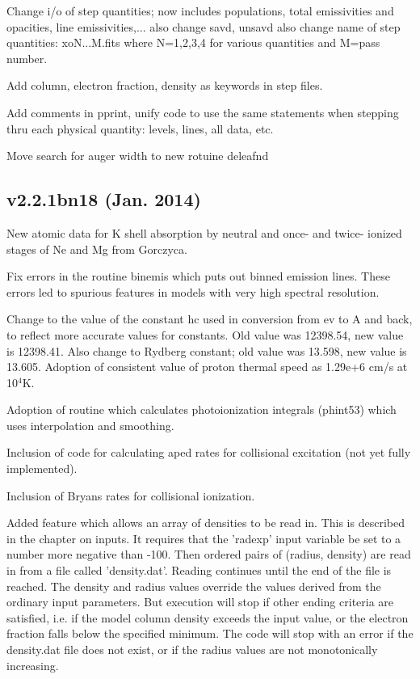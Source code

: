 Change i/o of step quantities; now includes populations, 
   total emissivities and opacities, line emissivities,...
   also change savd, unsavd
   also change name of step quantities:  xoN...M.fits where 
   N=1,2,3,4 for various quantities and M=pass number.

Add column, electron fraction, density as keywords in step files.

Add comments in pprint, unify code to use the same statements when 
  stepping thru each physical quantity:  levels, lines, all data, etc.

Move search for auger width to new rotuine deleafnd

\subsection{v2.2.1bn18 (Jan. 2014)}

New atomic data for K shell absorption by neutral and once- and twice- 
ionized stages of Ne and Mg from Gorczyca.

Fix errors in the routine binemis which puts out binned emission 
lines.  These errors led to spurious features in models with 
very high spectral resolution.

Change to the value of the constant hc used in conversion from 
ev to A and back, to reflect more accurate values for 
constants.  Old value was 12398.54, new value is 12398.41.
Also change to Rydberg constant; old value was 13.598, 
new value is 13.605.  Adoption of consistent value of proton 
thermal speed as 1.29e+6 cm/s at 10$^4$K.

Adoption of routine which calculates photoionization integrals
(phint53) which uses interpolation and smoothing.

Inclusion of code for calculating aped rates for 
collisional excitation (not yet fully implemented).

Inclusion of Bryans rates for collisional ionization.

Added feature which allows an array of densities to be read in.
This is described in the chapter on inputs.
It requires that the 'radexp' input variable be set to a number more 
negative than -100.  Then ordered pairs of (radius, density) are 
read in from a file called 'density.dat'.  Reading continues
until the end of the file is reached.   The density and 
radius values override the values derived from the ordinary 
input parameters.  But execution will stop if other ending 
criteria are satisfied, i.e. if the model column density 
exceeds the input value, or the electron fraction falls below the 
specified minimum.  The code will stop with an error if the
density.dat file does not exist, or if the radius values 
are not monotonically increasing.

